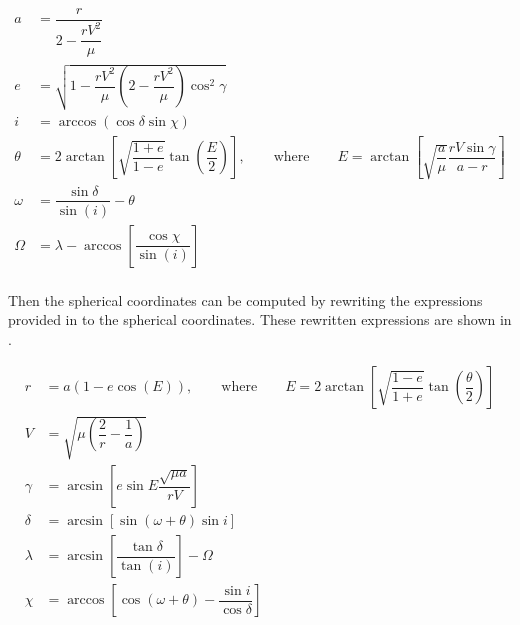 \begin{equation} \label{eq:sphertokepl}
\begin{split}
a&=\dfrac{r}{2-\dfrac{rV^{2}}{\mu}}\\
e&=\sqrt{1-\dfrac{rV^{2}}{\mu}\left(2-\dfrac{rV^{2}}{\mu}\right)\cos^{2}\gamma }\\
i&=\arccos\left(\cos\delta \sin\chi \right)\\
\theta&=2\arctan\left[\sqrt{\dfrac{1+e}{1-e}}\tan\left(\dfrac{E}{2}\right)\right], \qquad \text{where} \qquad E=\arctan\left[\sqrt{\dfrac{a}{\mu}}\dfrac{rV\sin\gamma }{a-r}\right] \\
\omega&=\dfrac{\sin\delta }{\sin\left(i\right)}-\theta\\
\Omega&=\lambda-\arccos\left[\dfrac{\cos\chi }{\sin\left(i\right)}\right]\\
\end{split}
\end{equation}   

\noindent
Then the spherical coordinates can be computed by rewriting the expressions provided in  to the spherical coordinates. These rewritten expressions are shown in . 

\begin{equation} \label{eq:kepltospher}
\begin{split}
r&= a\left(1-e\cos\left(E\right)\right), \qquad \text{where} \qquad E=2\arctan\left[\sqrt{\dfrac{1-e}{1+e}}\tan\left(\dfrac{\theta}{2}\right)\right]\\
V&=\sqrt{\mu\left(\dfrac{2}{r}-\dfrac{1}{a}\right)}\\
\gamma&=\arcsin\left[e\sin E\dfrac{\sqrt{\mu a}}{rV}\right]\\
\delta&=\arcsin\left[\sin\left(\omega+\theta\right)\sin i\right]\\
\lambda&=\arcsin\left[\dfrac{\tan\delta }{\tan\left(i\right)}\right]-\Omega\\
\chi&=\arccos\left[\cos\left(\omega+\theta\right)-\dfrac{\sin i}{\cos\delta }\right]\\
\end{split}
\end{equation} 


